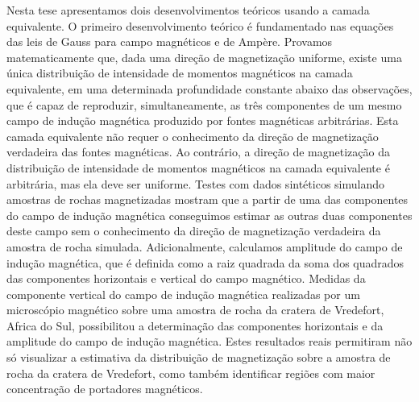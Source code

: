Nesta tese apresentamos dois desenvolvimentos teóricos usando a camada equivalente. O primeiro desenvolvimento teórico é fundamentado nas equações das leis de Gauss para campo magnéticos e de Ampère. Provamos matematicamente que, dada uma direção de magnetização uniforme, existe uma única distribuição de intensidade de momentos magnéticos na camada equivalente,  em uma determinada profundidade constante abaixo das observações, que é capaz de reproduzir, simultaneamente, as três componentes de um mesmo campo de indução magnética produzido por fontes magnéticas arbitrárias. Esta camada equivalente não requer o conhecimento da direção de magnetização verdadeira das fontes magnéticas. Ao contrário, a direção de magnetização da distribuição de intensidade de momentos magnéticos na camada equivalente é arbitrária, mas ela deve ser uniforme. Testes com dados sintéticos simulando amostras de rochas magnetizadas mostram que a partir de uma das componentes do campo de indução magnética conseguimos estimar as outras duas componentes deste campo sem o conhecimento da direção de magnetização verdadeira da amostra de rocha simulada. Adicionalmente, calculamos amplitude do campo de indução magnética, que é definida como a raiz quadrada da soma dos quadrados das componentes horizontais e vertical do campo magnético. Medidas da componente vertical do campo de indução magnética realizadas por um microscópio magnético sobre uma amostra de rocha da cratera de Vredefort, Africa do Sul, possibilitou a determinação das componentes horizontais e da amplitude do campo de indução magnética. Estes resultados reais permitiram não só visualizar a estimativa da distribuição de magnetização sobre a amostra de rocha da cratera de Vredefort, como também identificar regiões com maior concentração de portadores  magnéticos.

